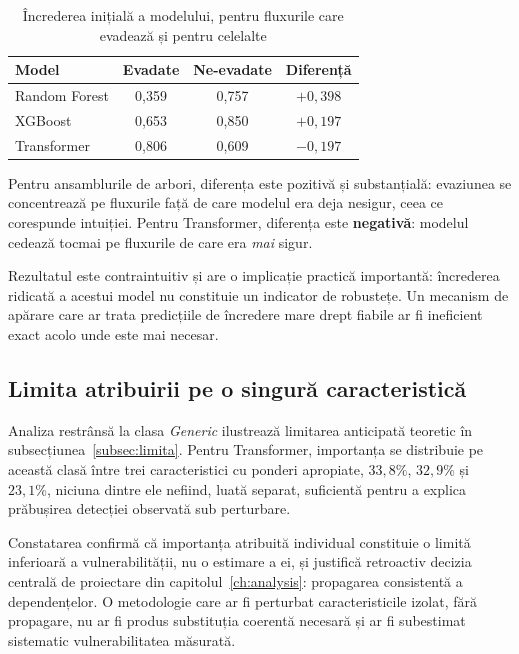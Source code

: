 \begin{table}[!ht]
    \caption{Încrederea inițială a modelului, pentru fluxurile care evadează și pentru celelalte}
    \centering
    \begin{tabular}{|l|c|c|c|}
        \hline
        \textbf{Model} & \textbf{Evadate} & \textbf{Ne-evadate} & \textbf{Diferență} \\
        \hline
        Random Forest & 0,359 & 0,757 & \textbf{$+0{,}398$} \\
        \hline
        XGBoost & 0,653 & 0,850 & $+0{,}197$ \\
        \hline
        Transformer & 0,806 & 0,609 & \textbf{$-0{,}197$} \\
        \hline
    \end{tabular}
    \label{tab:proximitate}
\end{table}

Pentru ansamblurile de arbori, diferența este pozitivă și substanțială: evaziunea se concentrează pe fluxurile față de care modelul era deja nesigur, ceea ce corespunde intuiției. Pentru Transformer, diferența este \textbf{negativă}: modelul cedează tocmai pe fluxurile de care era \emph{mai} sigur.

Rezultatul este contraintuitiv și are o implicație practică importantă: încrederea ridicată a acestui model nu constituie un indicator de robustețe. Un mecanism de apărare care ar trata predicțiile de încredere mare drept fiabile ar fi ineficient exact acolo unde este mai necesar.

\subsection{Limita atribuirii pe o singură caracteristică}\label{subsec:limitaatrib}

Analiza res\-trân\-să la clasa \textit{Generic} ilus\-trea\-ză li\-mi\-ta\-rea an\-ti\-ci\-pa\-tă te\-o\-re\-tic în subsecțiunea~\ref{subsec:limita}. Pentru Transformer, importanța se distribuie pe această clasă între trei caracteristici cu ponderi apropiate, $33{,}8\%$, $32{,}9\%$ și $23{,}1\%$, niciuna dintre ele nefiind, luată separat, suficientă pentru a explica prăbușirea detecției observată sub perturbare.

Constatarea confirmă că importanța atribuită individual constituie o limită inferioară a vulnerabilității, nu o estimare a ei, și justifică retroactiv decizia centrală de proiectare din capitolul~\ref{ch:analysis}: propagarea consistentă a dependențelor. O metodologie care ar fi perturbat caracteristicile izolat, fără propagare, nu ar fi produs substituția coerentă necesară și ar fi subestimat sistematic vulnerabilitatea măsurată.

